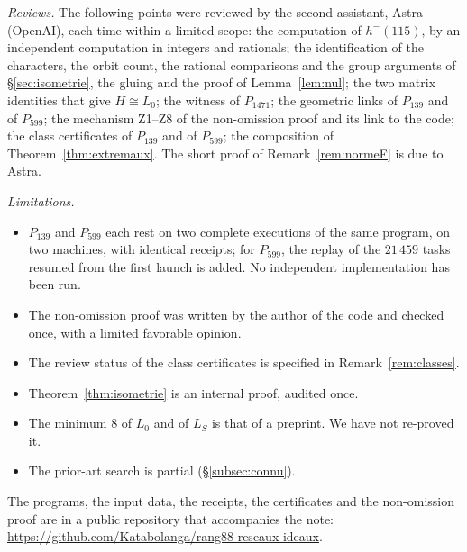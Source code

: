 \documentclass[11pt,a4paper]{amsart}
\theoremstyle{plain}
\theoremstyle{definition}
\numberwithin{equation}{section}
\newcommand{\Lz}{L_{0}}
\newcommand{\LS}{L_{S}}
\begin{document}
\emph{Reviews.} The following points were reviewed by the second assistant, Astra (OpenAI), each time within a limited scope: the computation of $h^-(115)$, by an independent computation in integers and rationals; the identification of the characters, the orbit count, the rational comparisons and the group arguments of \S\ref{sec:isometrie}, the gluing and the proof of Lemma~\ref{lem:nul}; the two matrix identities that give $H\cong\Lz$; the witness of $P_{1471}$; the geometric links of $P_{139}$ and of $P_{599}$; the mechanism Z1--Z8 of the non-omission proof and its link to the code; the class certificates of $P_{139}$ and of $P_{599}$; the composition of Theorem~\ref{thm:extremaux}. The short proof of Remark~\ref{rem:normeF} is due to Astra.

\emph{Limitations.}
\begin{itemize}
\item $P_{139}$ and $P_{599}$ each rest on two complete executions of the same program, on two machines, with identical receipts; for $P_{599}$, the replay of the $21\,459$ tasks resumed from the first launch is added. No independent implementation has been run.
\item The non-omission proof was written by the author of the code and checked once, with a limited favorable opinion.
\item The review status of the class certificates is specified in Remark~\ref{rem:classes}.
\item Theorem~\ref{thm:isometrie} is an internal proof, audited once.
\item The minimum $8$ of $\Lz$ and of $\LS$ is that of a preprint. We have not re-proved it.
\item The prior-art search is partial (\S\ref{subsec:connu}).
\end{itemize}

The programs, the input data, the receipts, the certificates and the non-omission proof are in a public repository that accompanies the note: \url{https://github.com/Katabolanga/rang88-reseaux-ideaux}.
\end{document}
